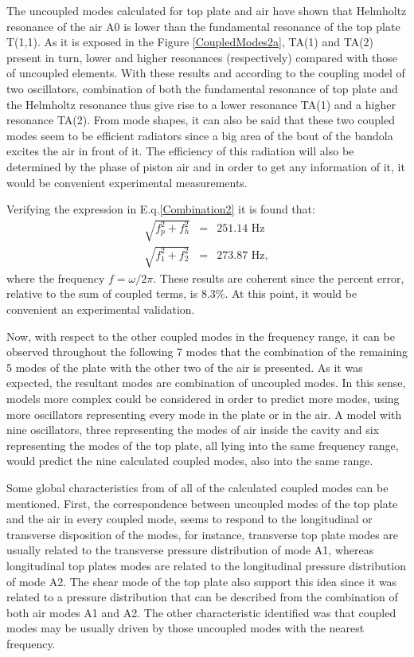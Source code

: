 The uncoupled modes calculated for top plate and air have shown that Helmholtz resonance of the air A0 is lower than the fundamental resonance of the top plate T(1,1). As it is exposed in the Figure \ref{CoupledModes2a}, TA(1) and TA(2) present in turn, lower and higher resonances (respectively) compared with those of uncoupled elements. With these results and according to the coupling model of two oscillators, combination of both the fundamental resonance of top plate and the Helmholtz resonance thus give rise to a lower resonance TA(1) and a higher resonance TA(2). From mode shapes, it can also be said that these two coupled modes seem to be efficient radiators since a big area of the bout of the bandola excites the air in front of it. The efficiency of this radiation will also be determined by the phase of piston air and in order to get any information of it, it would be convenient experimental measurements.

Verifying the expression in E.q.\ref{Combination2} it is found that:
\begin{eqnarray*}
\sqrt{f_p^2 + f_h^2} & = & 251.14 \text{ Hz}\\
\sqrt{f_1^2 + f_2^2} & = & 273.87 \text{ Hz},
\end{eqnarray*}
where the frequency $f=\omega / 2 \pi$. These results are coherent since the percent error, relative to the sum of coupled terms, is 8.3\%. At this point, it would be convenient an experimental validation.

Now, with respect to the other coupled modes in the frequency range, it can be observed throughout the following 7 modes that the combination of the remaining 5 modes of the plate with the other two of the air is presented. As it was expected, the resultant modes are combination of uncoupled modes. In this sense, models more complex could be considered in order to predict more modes, using more oscillators representing every mode in the plate or in the air. A model with nine oscillators, three representing the modes of air inside the cavity and six representing the modes of the top plate, all lying into the same frequency range, would predict the nine calculated coupled modes, also into the same range.

Some global characteristics from of all of the calculated coupled modes can be mentioned. First, the correspondence between uncoupled modes of the top plate and the air in every coupled mode, seems to respond to the longitudinal or transverse disposition of the modes, for instance, transverse top plate modes are usually related to the transverse pressure distribution of mode A1, whereas longitudinal top plates modes are related to the longitudinal pressure distribution of mode A2. The shear mode of the top plate also support this idea since it was related to a pressure distribution that can be described from the combination of both air modes A1 and A2. The other characteristic identified was that coupled modes may be usually driven by those uncoupled modes with the nearest frequency.

